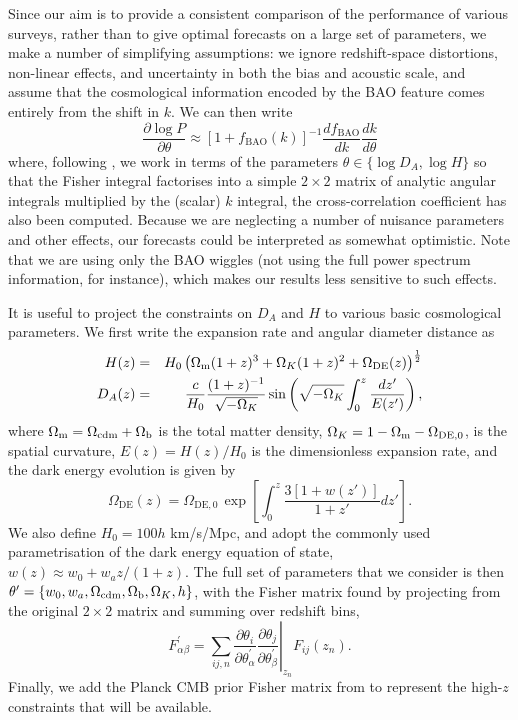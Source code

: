 \documentclass[useAMS,usenatbib]{mn2e}
\newcommand{\corr}{\color{blue}} %
\newcommand{\be}{\begin{equation}}
\newcommand{\ee}{\end{equation}}
\newcommand{\bea}{\begin{eqnarray}}
\newcommand{\eea}{\end{eqnarray}}
\begin{document}
{\corr Since our aim is to provide a consistent comparison of the performance of various surveys, rather than to give optimal forecasts on a large set of parameters, we make a number of simplifying assumptions:} we ignore redshift-space distortions, non-linear effects, and uncertainty in both the bias and acoustic scale, and assume that the cosmological information encoded by the BAO feature comes entirely from the shift in $k$. We can then write
\be
\frac{\partial \log P}{\partial \theta} \approx \left [1 + f_\mathrm{BAO}(k) \right ]^{-1} \frac{d f_\mathrm{BAO}}{d k} \frac{d k}{d\theta}
\ee
where, following \citet{Seo:2007ns}, we work in terms of the parameters $\theta \in \{ \log D_A, \log H\}$ so that the Fisher integral factorises into a simple $2\times 2$ matrix of analytic angular integrals multiplied by the (scalar) $k$ integral, {\corr the cross-correlation coefficient has also been computed}.  Because we are neglecting a number of nuisance parameters and other effects,  our forecasts could be interpreted as somewhat optimistic. {\corr Note that we are using only the BAO wiggles (not using the full power spectrum information, for instance), which makes our results less sensitive to such effects.}

It is useful to project the constraints on $D_A$ and $H$ to various basic cosmological parameters. We first write the expansion rate and angular diameter distance as
\bea
H(z) &=& H_0 \left ( \Omega_{\rm m} (1+z)^{3} + \Omega_K(1+ z)^2 + \Omega_{\rm DE}(z) \right )^\frac{1}{2} \nonumber \\
D_{A}(z) &=& \frac{c}{H_0}\frac{(1+z)^{-1}}{\sqrt{-\Omega_K}}\sin\left(\sqrt{-\Omega_K} \int_0^z \frac{dz'}{E(z')}\right), \nonumber
\eea
where $\Omega_{\rm m}=\Omega_{{\rm cdm}} + \Omega_{\rm b}$ is the total matter density, $\Omega_K  = 1- \Omega_{\rm m} - \Omega_\mathrm{DE,0}$, is the spatial curvature, $E(z) = H(z)/H_0$ is the dimensionless expansion rate, and the dark energy evolution is given by
\begin{equation}\label{Fz}
\Omega_\mathrm{DE}(z)= \Omega_\mathrm{DE, 0} \,\exp \left [{\int_0^z \frac{3[1+w(z')]}{1+z'}dz'} \right ].
\end{equation}
We also define $H_0 = 100 h$ km/s/Mpc, and adopt the commonly used parametrisation of the dark energy equation of state, $w(z) \approx w_0 + w_a z/(1+z)$. The full set of parameters that we consider is then $\theta^\prime = \{ w_0, w_a,\Omega_{\rm cdm}, \Omega_{\rm b}, \Omega_K, h\}$, with the Fisher matrix found by projecting from the original $2 \times 2$ matrix and summing over redshift bins,
\begin{equation}\label{Eq:F_ab}
{F}^\prime_{\alpha\beta}=\sum_{ij,n} \left .{\frac{\partial \theta_i}{\partial \theta^\prime_\alpha}}{\frac{\partial \theta_j}{\partial \theta^\prime_\beta}}\right |_{z_n}\!\! F_{ij}(z_n).
\end{equation}
Finally, we add the Planck CMB prior Fisher matrix from \citet{2013LRR....16....6A} to represent the high-$z$ constraints that will be available.
\end{document}
